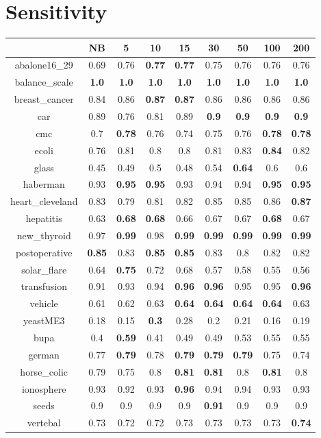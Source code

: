 \documentclass{article}%
\begin{document}
%
\section*{Sensitivity}%
\begin{tabular}{c|cccccccc}%
\hline%
&NB&5&10&15&30&50&100&200\\%
\hline%
abalone16\_29&0.69&0.76&\textbf{0.77}&\textbf{0.77}&0.75&0.76&0.76&0.76\\%
\hline%
balance\_scale&\textbf{1.0}&\textbf{1.0}&\textbf{1.0}&\textbf{1.0}&\textbf{1.0}&\textbf{1.0}&\textbf{1.0}&\textbf{1.0}\\%
\hline%
breast\_cancer&0.84&0.86&\textbf{0.87}&\textbf{0.87}&0.86&0.86&0.86&0.86\\%
\hline%
car&0.89&0.76&0.81&0.89&\textbf{0.9}&\textbf{0.9}&\textbf{0.9}&\textbf{0.9}\\%
\hline%
cmc&0.7&\textbf{0.78}&0.76&0.74&0.75&0.76&\textbf{0.78}&\textbf{0.78}\\%
\hline%
ecoli&0.76&0.81&0.8&0.8&0.81&0.83&\textbf{0.84}&0.82\\%
\hline%
glass&0.45&0.49&0.5&0.48&0.54&\textbf{0.64}&0.6&0.6\\%
\hline%
haberman&0.93&\textbf{0.95}&\textbf{0.95}&0.93&0.94&0.94&\textbf{0.95}&\textbf{0.95}\\%
\hline%
heart\_cleveland&0.83&0.79&0.81&0.82&0.85&0.85&0.86&\textbf{0.87}\\%
\hline%
hepatitis&0.63&\textbf{0.68}&\textbf{0.68}&0.66&0.67&0.67&\textbf{0.68}&0.67\\%
\hline%
new\_thyroid&0.97&\textbf{0.99}&0.98&\textbf{0.99}&\textbf{0.99}&\textbf{0.99}&\textbf{0.99}&\textbf{0.99}\\%
\hline%
postoperative&\textbf{0.85}&0.83&\textbf{0.85}&\textbf{0.85}&0.83&0.8&0.82&0.82\\%
\hline%
solar\_flare&0.64&\textbf{0.75}&0.72&0.68&0.57&0.58&0.55&0.56\\%
\hline%
transfusion&0.91&0.93&0.94&\textbf{0.96}&\textbf{0.96}&0.95&0.95&\textbf{0.96}\\%
\hline%
vehicle&0.61&0.62&0.63&\textbf{0.64}&\textbf{0.64}&\textbf{0.64}&\textbf{0.64}&0.63\\%
\hline%
yeastME3&0.18&0.15&\textbf{0.3}&0.28&0.2&0.21&0.16&0.19\\%
\hline%
bupa&0.4&\textbf{0.59}&0.41&0.49&0.49&0.53&0.55&0.55\\%
\hline%
german&0.77&\textbf{0.79}&0.78&\textbf{0.79}&\textbf{0.79}&\textbf{0.79}&0.75&0.74\\%
\hline%
horse\_colic&0.79&0.75&0.8&\textbf{0.81}&\textbf{0.81}&0.8&\textbf{0.81}&0.8\\%
\hline%
ionosphere&0.93&0.92&0.93&\textbf{0.96}&0.94&0.94&0.93&0.93\\%
\hline%
seeds&0.9&0.9&0.9&0.9&\textbf{0.91}&0.9&0.9&0.9\\%
\hline%
vertebal&0.73&0.72&0.72&0.73&0.73&0.73&0.73&\textbf{0.74}\\%
\hline%
\end{tabular}
\end{document}
